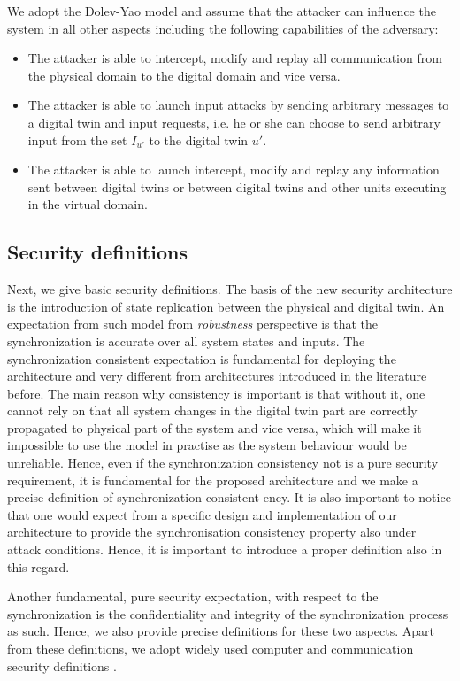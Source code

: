 We adopt the Dolev-Yao model \cite{Dolev1981} and assume that the attacker can influence the system in all other aspects including the following capabilities of the adversary:
\begin{itemize}
    \item The attacker is able to intercept, modify and replay all communication from the physical domain to the digital domain and vice versa.
    \item The attacker is able to launch input attacks by sending arbitrary messages to a digital twin and input requests, i.e. he or she can choose to send arbitrary input from the set $I_{u'}$ to the digital twin $u'$.
    \item The attacker is able to launch intercept, modify and replay any information sent between digital twins or between digital twins and other units executing in the virtual domain.
\end{itemize}

\subsection{Security definitions}
Next, we give basic security definitions. The basis of the new security architecture is the introduction of state replication between the physical and digital twin. An expectation from such model from \emph{robustness} perspective is that the synchronization is accurate over all system states and inputs. The synchronization consistent expectation is fundamental for deploying the architecture and very different from architectures introduced in the literature before. The main reason why consistency is important is that without it, one cannot rely on that all system changes in the digital twin part are correctly propagated to physical part of the system and vice versa, which will make it impossible to use the model in practise as the system behaviour would be unreliable. Hence, even if the synchronization consistency not is a pure security requirement, it is fundamental for the proposed architecture and we make a precise definition of synchronization consistent ency. It is also important to notice that one would expect from a specific design and implementation of our architecture to provide the synchronisation consistency property also under attack conditions. Hence, it is important to introduce a proper definition also in this regard.

Another fundamental, pure security expectation, with respect to the synchronization is the confidentiality and integrity of the synchronization process as such. Hence, we also provide precise definitions for these two aspects.  Apart from these definitions, we adopt widely used computer and communication security definitions \cite{Stallings2014}.

